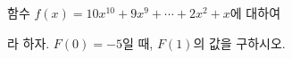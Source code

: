 함수 $f(x)=10x^{10}+9x^9+\cdots+2x^2+x$에 대하여 \par\smallskip{}\par\smallskip\noindent 라 하자. $F(0)=-5$일 때, $F(1)$의 값을 구하시오.

